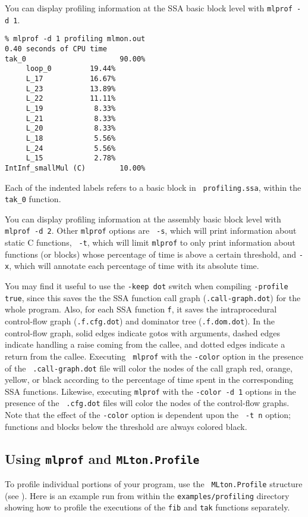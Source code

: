 You can display profiling information at the SSA basic block level
with {\tt mlprof -d 1}.

\begin{verbatim}
% mlprof -d 1 profiling mlmon.out
0.40 seconds of CPU time
tak_0                      90.00%
     loop_0         19.44%       
     L_17           16.67%       
     L_23           13.89%       
     L_22           11.11%       
     L_19            8.33%       
     L_21            8.33%       
     L_20            8.33%       
     L_18            5.56%       
     L_24            5.56%       
     L_15            2.78%       
IntInf_smallMul (C)        10.00%
\end{verbatim}
Each of the indented labels refers to a basic block in {\tt
  profiling.ssa}, within the {\tt tak\_0} function.

You can display profiling information at the assembly basic block
level with {\tt mlprof -d 2}.  Other {\tt mlprof} options are {\tt
  -s}, which will print information about static C functions, {\tt
  -t}, which will limit {\tt mlprof} to only print information about
functions (or blocks) whose percentage of time is above a certain
threshold, and {\tt -x}, which will annotate each percentage of time
with its absolute time.

You may find it useful to use the {\tt -keep dot} switch when
compiling {\tt -profile true}, since this saves the the SSA function
call graph ({\tt .call-graph.dot}) for the whole program.  Also, for
each SSA function {\tt f}, it saves the intraprocedural control-flow
graph ({\tt .f.cfg.dot}) and dominator tree ({\tt .f.dom.dot}).  In
the control-flow graph, solid edges indicate gotos with arguments,
dashed edges indicate handling a raise coming from the callee, and
dotted edges indicate a return from the callee.  Executing {\tt
mlprof} with the {\tt -color} option in the presence of the {\tt
.call-graph.dot} file will color the nodes of the call graph red,
orange, yellow, or black according to the percentage of time spent in
the corresponding SSA functions.  Likewise, executing {\tt mlprof}
with the {\tt -color -d 1} options in the presence of the {\tt
.cfg.dot} files will color the nodes of the control-flow graphs.  Note
that the effect of the {\tt -color} option is dependent upon the {\tt
-t n} option; functions and blocks below the threshold are always
colored black.

\subsection{Using {\tt mlprof} and {\tt MLton.Profile}}
To profile individual portions of your program, use the {\tt
MLton.Profile} structure (see ).
Here is an example run from within the {\tt examples/profiling}
directory showing how to profile the executions of the {\tt fib} and
{\tt tak} functions separately.

